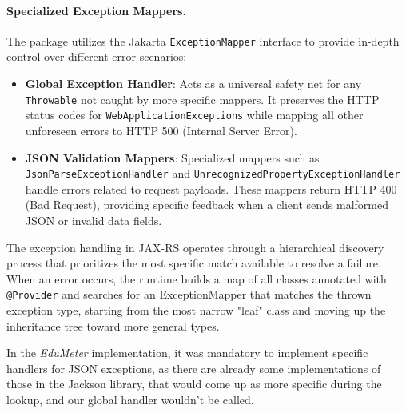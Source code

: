 \paragraph{\textbf{Specialized Exception Mappers.}} The package utilizes the Jakarta \texttt{ExceptionMapper} interface to provide in-depth control over different error scenarios:

\begin{itemize}
	\item \textbf{Global Exception Handler}: Acts as a universal safety net for any \texttt{Throwable} not caught by more specific mappers. It preserves the HTTP status codes for \texttt{WebApplicationExceptions} while mapping all other unforeseen errors to HTTP 500 (Internal Server Error).
	\item \textbf{JSON Validation Mappers}: Specialized mappers such as \texttt{JsonParseExceptionHandler} and \texttt{UnrecognizedPropertyExceptionHandler} handle errors related to request payloads. These mappers return HTTP 400 (Bad Request), providing specific feedback when a client sends malformed JSON or invalid data fields.
\end{itemize}

The exception handling in JAX-RS operates through a hierarchical discovery process that prioritizes the most specific match available to resolve a failure. When an error occurs, the runtime builds a map of all classes annotated with \texttt{@Provider} and searches for an ExceptionMapper that matches the thrown exception type, starting from the most narrow "leaf" class and moving up the inheritance tree toward more general types.

In the \textit{EduMeter} implementation, it was mandatory to implement specific handlers for JSON exceptions, as there are already some implementations of those in the Jackson library, that would come up as more specific during the lookup, and our global handler wouldn't be called.

\vspace{2em}

